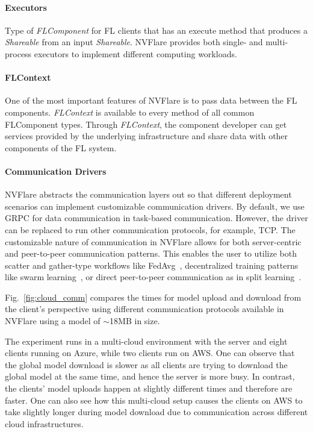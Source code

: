 \documentclass[11pt]{article}
\begin{document}
\paragraph{Executors} Type of \textit{FLComponent} for FL clients that has an execute method that produces a \textit{Shareable} from an input \textit{Shareable}. NVFlare provides both single- and multi-process executors to implement different computing workloads.

\paragraph{FLContext} One of the most important features of NVFlare is to pass data between the FL components. \textit{FLContext} is available to every method of all common FLComponent types. Through \textit{FLContext}, the component developer can get services provided by the underlying infrastructure and share data with other components of the FL system.

\paragraph{Communication Drivers}
NVFlare abstracts the communication layers out so that different deployment scenarios can implement customizable communication drivers. By default, we use GRPC for data communication in task-based communication. However, the driver can be replaced to run other communication protocols, for example, TCP. The customizable nature of communication in NVFlare allows for both server-centric and peer-to-peer communication patterns. This enables the user to utilize both scatter and gather-type workflows like FedAvg~\cite{Holger-mcmahan2017communication}, decentralized training patterns like swarm learning~\cite{Holger-warnat2021swarm}, or direct peer-to-peer communication as in split learning~\cite{Holger-gupta2018distributed}.

Fig.~\ref{fig:cloud_comm} compares the times for model upload and download from the client's perspective using different communication protocols available in NVFlare using a model of $\sim$18MB in size.

The experiment runs in a multi-cloud environment with the server and eight clients running on Azure, while two clients run on AWS. One can observe that the global model download is slower as all clients are trying to download the global model at the same time, and hence the server is more busy. In contrast, the clients' model uploads happen at slightly different times and therefore are faster. One can also see how this multi-cloud setup causes the clients on AWS to take slightly longer during model download due to communication across different cloud infrastructures.
\end{document}
